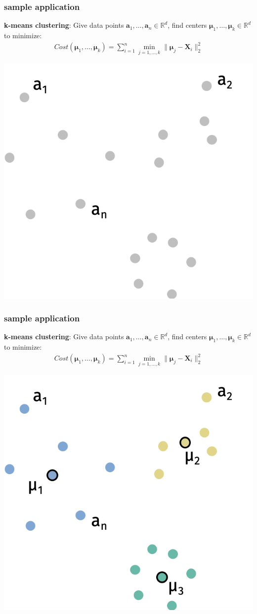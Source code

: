 \documentclass[compress,handout]{beamer}
\newcommand{\bs}[1]{\boldsymbol{#1}}
\newcommand{\bv}[1]{\mathbf{#1}}
\newcommand{\R}{\mathbb{R}}
\begin{document}
\begin{frame}[t]
	\frametitle{sample application}
	\textbf{k-means clustering}: Give data points $\bv{a}_1,\ldots, \bv{a}_n \in \R^d$, find centers $\bs{\mu}_1, \ldots, \bs{\mu}_k\in \R^d$ to minimize:
	\begin{align*}
		Cost(\bs{\mu}_1,\ldots, \bs{\mu}_k) = \sum_{i=1}^n \min_{j = 1,\ldots,k} \|\bs{\mu}_j - \bv{X}_i\|_2^2
	\end{align*}
	\begin{center}
		\includegraphics[width=.5\textwidth]{kmeans1.png}
	\end{center}
\end{frame}
\begin{frame}[t]
	\frametitle{sample application}
	\textbf{k-means clustering}: Give data points $\bv{a}_1,\ldots, \bv{a}_n \in \R^d$, find centers $\bs{\mu}_1, \ldots, \bs{\mu}_k\in \R^d$ to minimize:
	\begin{align*}
		Cost(\bs{\mu}_1,\ldots, \bs{\mu}_k) = \sum_{i=1}^n \min_{j = 1,\ldots,k} \|\bs{\mu}_j - \bv{X}_i\|_2^2
	\end{align*}
	\begin{center}
		\includegraphics[width=.5\textwidth]{kmeans2.png}
	\end{center}
\end{frame}
\end{document}
